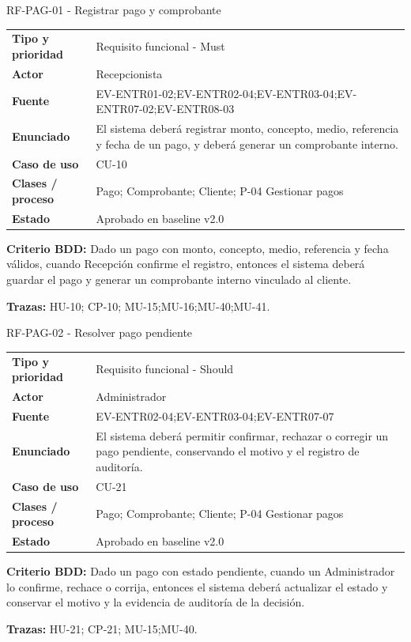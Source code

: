\begin{reqbox}{RF-PAG-01 - Registrar pago y comprobante}
\begin{tabularx}{\textwidth}{>{\bfseries}p{3.2cm}Y}
Tipo y prioridad & Requisito funcional - Must \\
Actor & Recepcionista \\
Fuente & EV-ENTR01-02;EV-ENTR02-04;EV-ENTR03-04;EV-ENTR07-02;EV-ENTR08-03 \\
Enunciado & El sistema deberá registrar monto, concepto, medio, referencia y fecha de un pago, y deberá generar un comprobante interno. \\
Caso de uso & CU-10 \\
Clases / proceso & Pago; Comprobante; Cliente; P-04 Gestionar pagos \\
Estado & Aprobado en baseline v2.0 \\
\end{tabularx}
\textbf{Criterio BDD:} Dado un pago con monto, concepto, medio, referencia y fecha válidos, cuando Recepción confirme el registro, entonces el sistema deberá guardar el pago y generar un comprobante interno vinculado al cliente.

\textbf{Trazas:} HU-10; CP-10; MU-15;MU-16;MU-40;MU-41.
\end{reqbox}


\begin{reqbox}{RF-PAG-02 - Resolver pago pendiente}
\begin{tabularx}{\textwidth}{>{\bfseries}p{3.2cm}Y}
Tipo y prioridad & Requisito funcional - Should \\
Actor & Administrador \\
Fuente & EV-ENTR02-04;EV-ENTR03-04;EV-ENTR07-07 \\
Enunciado & El sistema deberá permitir confirmar, rechazar o corregir un pago pendiente, conservando el motivo y el registro de auditoría. \\
Caso de uso & CU-21 \\
Clases / proceso & Pago; Comprobante; Cliente; P-04 Gestionar pagos \\
Estado & Aprobado en baseline v2.0 \\
\end{tabularx}
\textbf{Criterio BDD:} Dado un pago con estado pendiente, cuando un Administrador lo confirme, rechace o corrija, entonces el sistema deberá actualizar el estado y conservar el motivo y la evidencia de auditoría de la decisión.

\textbf{Trazas:} HU-21; CP-21; MU-15;MU-40.
\end{reqbox}


